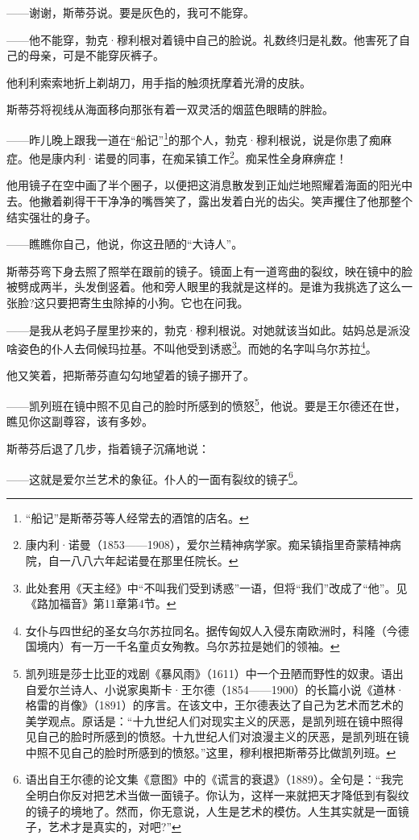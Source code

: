 \par ——谢谢，斯蒂芬说。要是灰色的，我可不能穿。
\par ——他不能穿，勃克·穆利根对着镜中自己的脸说。礼数终归是礼数。他害死了自己的母亲，可是不能穿灰裤子。
\par 他利利索索地折上剃胡刀，用手指的触须抚摩着光滑的皮肤。
\par 斯蒂芬将视线从海面移向那张有着一双灵活的烟蓝色眼睛的胖脸。
\par ——昨儿晚上跟我一道在“船记”\footnote{“船记”是斯蒂芬等人经常去的酒馆的店名。}的那个人，勃克·穆利根说，说是你患了痴麻症。他是康内利·诺曼的同事，在痴呆镇工作\footnote{康内利·诺曼（1853——1908），爱尔兰精神病学家。痴呆镇指里奇蒙精神病院，自一八八六年起诺曼在那里任院长。}。痴呆性全身麻痹症！
\par 他用镜子在空中画了半个圈子，以便把这消息散发到正灿烂地照耀着海面的阳光中去。他撇着剃得干干净净的嘴唇笑了，露出发着白光的齿尖。笑声攫住了他那整个结实强壮的身子。
\par ——瞧瞧你自己，他说，你这丑陋的“大诗人”。
\par 斯蒂芬弯下身去照了照举在跟前的镜子。镜面上有一道弯曲的裂纹，映在镜中的脸被劈成两半，头发倒竖着。他和旁人眼里的我就是这样的。是谁为我挑选了这么一张脸?这只要把寄生虫除掉的小狗。它也在问我。
\par ——是我从老妈子屋里抄来的，勃克·穆利根说。对她就该当如此。姑妈总是派没啥姿色的仆人去伺候玛拉基。不叫他受到诱惑\footnote{此处套用《天主经》中“不叫我们受到诱惑”一语，但将“我们”改成了“他”。见《路加福音》第11章第4节。}。而她的名字叫乌尔苏拉\footnote{女仆与四世纪的圣女乌尔苏拉同名。据传匈奴人入侵东南欧洲时，科隆（今德国境内）有一万一千名童贞女殉教。乌尔苏拉是她们的领袖。}。
\par 他又笑着，把斯蒂芬直勾勾地望着的镜子挪开了。
\par ——凯列班在镜中照不见自己的脸时所感到的愤怒\footnote{凯列班是莎士比亚的戏剧《暴风雨》（1611）中一个丑陋而野性的奴隶。语出自爱尔兰诗人、小说家奥斯卡·王尔德（1854——1900）的长篇小说《道林·格雷的肖像》（1891）的序言。在该文中，王尔德表达了自己为艺术而艺术的美学观点。原话是：“十九世纪人们对现实主义的厌恶，是凯列班在镜中照得见自己的脸时所感到的愤怒。十九世纪人们对浪漫主义的厌恶，是凯列班在镜中照不见自己的脸时所感到的愤怒。”这里，穆利根把斯蒂芬比做凯列班。}，他说。要是王尔德还在世，瞧见你这副尊容，该有多妙。
\par 斯蒂芬后退了几步，指着镜子沉痛地说：
\par ——这就是爱尔兰艺术的象征。仆人的一面有裂纹的镜子\footnote{语出自王尔德的论文集《意图》中的《谎言的衰退》（1889）。全句是：“我完全明白你反对把艺术当做一面镜子。你认为，这样一来就把天才降低到有裂纹的镜子的境地了。然而，你无意说，人生是艺术的模仿。人生其实就是一面镜子，艺术才是真实的，对吧?”}。
